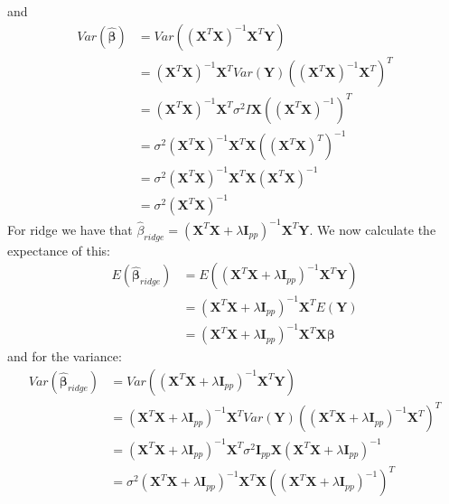 \documentclass{article}
\begin{document}
and
\begin{align*}
    Var(\mathbf{\hat{\beta}}) & = Var((\mathbf{X}^T \mathbf{X})^{-1} \mathbf{X}^T \mathbf{Y})                                                              \\
                              & = (\mathbf{X}^T \mathbf{X})^{-1} \mathbf{X}^T Var(\mathbf{Y}) \left( (\mathbf{X}^T \mathbf{X})^{-1} \mathbf{X}^T \right)^T \\
                              & = (\mathbf{X}^T \mathbf{X})^{-1} \mathbf{X}^T \sigma^2 I \mathbf{X} \left( (\mathbf{X}^T \mathbf{X})^{-1} \right)^T        \\
                              & = \sigma^2 (\mathbf{X}^T \mathbf{X})^{-1} \mathbf{X}^T \mathbf{X} \left((\mathbf{X}^T \mathbf{X})^T \right)^{-1}           \\
                              & = \sigma^2 (\mathbf{X}^T \mathbf{X})^{-1} \mathbf{X}^T \mathbf{X} (\mathbf{X}^T \mathbf{X})^{-1}                           \\
                              & = \sigma^2 (\mathbf{X}^T \mathbf{X})^{-1}
\end{align*}
For ridge we have that $\hat{\beta}_{ridge} = (\mathbf{X}^T \mathbf{X} + \lambda
    \mathbf{I}_{p p})^{-1} \mathbf{X}^T \mathbf{Y}$. We now calculate the expectance
of this:
\begin{align*}
    E(\mathbf{\hat{\beta}}_{ridge}) & = E((\mathbf{X}^T \mathbf{X} + \lambda \mathbf{I}_{p p})^{-1} \mathbf{X}^T \mathbf{Y})             \\
                                    & = (\mathbf{X}^T \mathbf{X} + \lambda \mathbf{I}_{p p})^{-1} \mathbf{X}^T E(\mathbf{Y})             \\
                                    & = (\mathbf{X}^T \mathbf{X} + \lambda \mathbf{I}_{p p})^{-1} \mathbf{X}^T \mathbf{X} \mathbf{\beta}
\end{align*}
and for the variance:
\begin{align*}
    Var(\mathbf{\hat{\beta}}_{ridge}) & = Var((\mathbf{X}^T \mathbf{X} + \lambda \mathbf{I}_{p p})^{-1} \mathbf{X}^T \mathbf{Y})                                                                                \\
                                      & = (\mathbf{X}^T \mathbf{X} + \lambda \mathbf{I}_{p p})^{-1} \mathbf{X}^T Var(\mathbf{Y})  ((\mathbf{X}^T \mathbf{X} + \lambda \mathbf{I}_{p p})^{-1} \mathbf{X}^T)^T    \\
                                      & = (\mathbf{X}^T \mathbf{X} + \lambda \mathbf{I}_{p p})^{-1} \mathbf{X}^T \sigma^2 \mathbf{I}_{p p} \mathbf{X} (\mathbf{X}^T \mathbf{X} + \lambda \mathbf{I}_{p p})^{-1} \\
                                      & = \sigma^2 (\mathbf{X}^T \mathbf{X} + \lambda \mathbf{I}_{p p})^{-1} \mathbf{X}^T \mathbf{X} ((\mathbf{X}^T \mathbf{X} + \lambda \mathbf{I}_{p p})^{-1})^T              \\
\end{align*}
\end{document}
